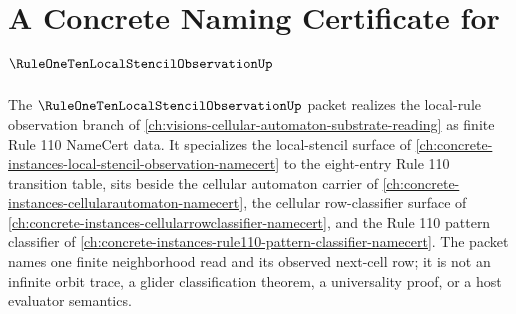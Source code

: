 \chapter{A Concrete Naming Certificate for $\RuleOneTenLocalStencilObservationUp$}
\label{ch:concrete-instances-rule110-local-stencil-observation-namecert}

The $\RuleOneTenLocalStencilObservationUp$ packet realizes the local-rule observation branch of \autoref{ch:visions-cellular-automaton-substrate-reading} as finite Rule 110 NameCert data. It specializes the local-stencil surface of \autoref{ch:concrete-instances-local-stencil-observation-namecert} to the eight-entry Rule 110 transition table, sits beside the cellular automaton carrier of \autoref{ch:concrete-instances-cellularautomaton-namecert}, the cellular row-classifier surface of \autoref{ch:concrete-instances-cellularrowclassifier-namecert}, and the Rule 110 pattern classifier of \autoref{ch:concrete-instances-rule110-pattern-classifier-namecert}. The packet names one finite neighborhood read and its observed next-cell row; it is not an infinite orbit trace, a glider classification theorem, a universality proof, or a host evaluator semantics.

